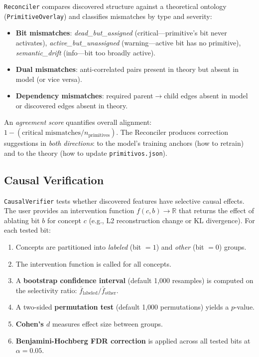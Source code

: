 \documentclass[11pt]{article}
\begin{document}
\texttt{Reconciler} compares discovered structure against a theoretical ontology (\texttt{PrimitiveOverlay}) and classifies mismatches by type and severity:
\begin{itemize}[nosep]
    \item \textbf{Bit mismatches}: \emph{dead\_but\_assigned} (critical---primitive's bit never activates), \emph{active\_but\_un\-assigned} (warning---active bit has no primitive), \emph{semantic\_drift} (info---bit too broadly active).
    \item \textbf{Dual mismatches}: anti-correlated pairs present in theory but absent in model (or vice versa).
    \item \textbf{Dependency mismatches}: required parent$\to$child edges absent in model or discovered edges absent in theory.
\end{itemize}
An \emph{agreement score} quantifies overall alignment: $1 - (\text{critical mismatches} / n_{\text{primitives}})$. The Reconciler produces correction suggestions in \emph{both directions}: to the model's training anchors (how to retrain) and to the theory (how to update \texttt{primitivos.json}).

\subsection{Causal Verification}

\texttt{CausalVerifier} tests whether discovered features have selective causal effects. The user provides an intervention function $f(c, b) \to \mathbb{R}$ that returns the effect of ablating bit $b$ for concept $c$ (e.g., L2 reconstruction change or KL divergence). For each tested bit:

\begin{enumerate}[nosep]
    \item Concepts are partitioned into \emph{labeled} (bit $= 1$) and \emph{other} (bit $= 0$) groups.
    \item The intervention function is called for all concepts.
    \item A \textbf{bootstrap confidence interval} (default 1{,}000 resamples) is computed on the selectivity ratio: $\bar{f}_{\text{labeled}} / \bar{f}_{\text{other}}$.
    \item A two-sided \textbf{permutation test} (default 1{,}000 permutations) yields a $p$-value.
    \item \textbf{Cohen's $d$} measures effect size between groups.
    \item \textbf{Benjamini-Hochberg FDR correction} is applied across all tested bits at $\alpha = 0.05$.
\end{enumerate}
\end{document}
